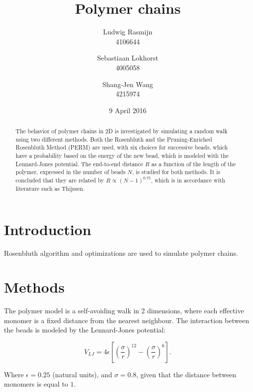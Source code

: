 \documentclass[a4paper,twocolumn]{article}
\begin{document}
\title{Polymer chains}
\date{9 April 2016}
\author{Ludwig Rasmijn\\ 4106644 \and Sebastiaan Lokhorst\\ 4005058 \and Shang-Jen Wang\\ 4215974}
\maketitle

\begin{abstract}
	The behavior of polymer chains in 2D is investigated by simulating a random walk using two different methods.
	Both the Rosenbluth and the Pruning-Enriched Rosenbluth Method (PERM) are used, with six choices for successive beads, which have a probability based on the energy of the new bead, which is modeled with the Lennard-Jones potential.
	The end-to-end distance $R$ as a function of the length of the polymer, expressed in the number of beads $N$, is studied for both methods. It is concluded that they are related by $R \propto (N-1)^{0.75}$, which is in accordance with literature such as Thijssen\cite{thijssen}.
\end{abstract}

\section{Introduction}
Rosenbluth algorithm and optimizations are used to simulate polymer chains. 

\section{Methods}
The polymer model is a self-avoiding walk in 2 dimensions, where each effective monomer is a fixed distance from the nearest neighbour. The interaction between the beads is modeled by the Lennard-Jones potential:

\begin{equation}\label{eq:lennardjones}
	V_{LJ}=4\epsilon \left[ \left( \frac{\sigma}{r} \right)^{12} - \left( \frac{\sigma}{r} \right)^{6} \right]\text{.}
\end{equation}

Where $\epsilon = 0.25$ (natural units), and $\sigma = 0.8$, given that the distance between monomers is equal to $1$.
\end{document}

